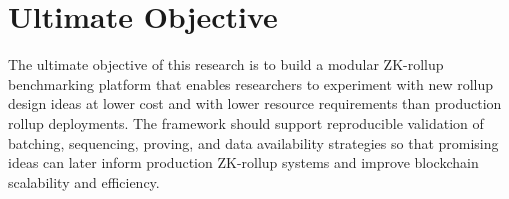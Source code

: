 \section{Ultimate Objective}
\label{sec:ultimate_objective}

The ultimate objective of this research is to build a modular ZK-rollup benchmarking platform that enables researchers to experiment with new rollup design ideas at lower cost and with lower resource requirements than production rollup deployments. The framework should support reproducible validation of batching, sequencing, proving, and data availability strategies so that promising ideas can later inform production ZK-rollup systems and improve blockchain scalability and efficiency.
